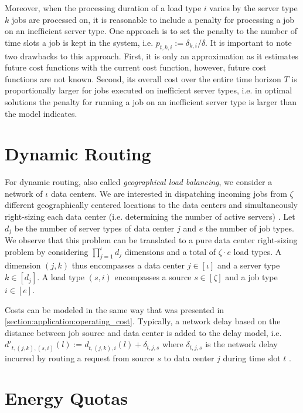 Moreover, when the processing duration of a load type $i$ varies by the server type $k$ jobs are processed on, it is reasonable to include a penalty for processing a job on an inefficient server type. One approach is to set the penalty to the number of time slots a job is kept in the system, i.e. $p_{t,k,i} := \delta_{k,i} / \delta$. It is important to note two drawbacks to this approach. First, it is only an approximation as it estimates future cost functions with the current cost function, however, future cost functions are not known. Second, its overall cost over the entire time horizon $T$ is proportionally larger for jobs executed on inefficient server types, i.e. in optimal solutions the penalty for running a job on an inefficient server type is larger than the model indicates.

\section{Dynamic Routing}\label{section:application:dynamic_routing}

For dynamic routing, also called \textit{geographical load balancing}, we consider a network of $\iota$ data centers. We are interested in dispatching incoming jobs from $\zeta$ different geographically centered locations to the data centers and simultaneously right-sizing each data center (i.e. determining the number of active servers) \cite{Lin2012}. Let $d_j$ be the number of server types of data center $j$ and $e$ the number of job types. We observe that this problem can be translated to a pure data center right-sizing problem by considering $\prod_{j=1}^{\iota} d_j$ dimensions and a total of $\zeta \cdot e$ load types. A dimension $(j,k)$ thus encompasses a data center $j \in [\iota]$ and a server type $k \in [d_j]$. A load type $(s,i)$ encompasses a source $s \in [\zeta]$ and a job type $i \in [e]$.

Costs can be modeled in the same way that was presented in \autoref{section:application:operating_cost}. Typically, a network delay based on the distance between job source and data center is added to the delay model, i.e. $d'_{t,(j,k),(s,i)}(l) := d_{t,(j,k),i}(l) + \delta_{t,j,s}$ where $\delta_{t,j,s}$ is the network delay incurred by routing a request from source $s$ to data center $j$ during time slot $t$ \cite{Lin2012}.

\section{Energy Quotas}\label{section:application:energy_quotas}

